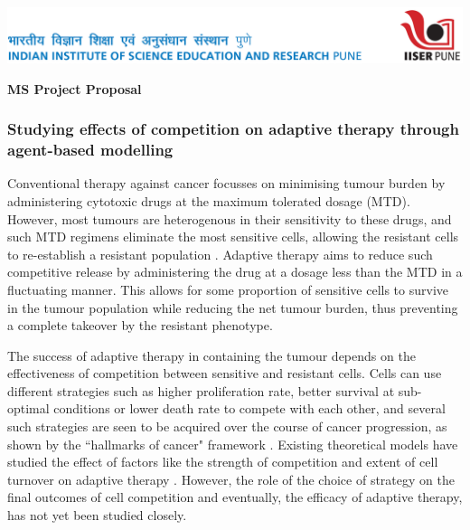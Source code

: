 \documentclass[12pt]{article}
\newcommand\dunderline[3][-1pt]{{%
  \setbox0=\hbox{#3}
  \ooalign{\copy0\cr\rule[\dimexpr#1-#2\relax]{\wd0}{#2}}}}
\begin{document}
\vspace*{-25mm}
\hspace*{-20mm}

\includegraphics{internal-lhead.png}

\begin{center}
{\bfseries\large MS Project Proposal}
\end{center}


\subsubsection*{Studying effects of competition on adaptive therapy through agent-based modelling}

     Conventional therapy against cancer focusses on minimising tumour burden by administering cytotoxic drugs at the maximum tolerated dosage (MTD). However, most tumours are heterogenous in their sensitivity to these drugs, and such MTD regimens eliminate the most sensitive cells, allowing the resistant cells to re-establish a resistant population \cite{Gatenby}. Adaptive therapy aims to reduce such competitive release by administering the drug at a dosage less than the MTD in a fluctuating manner. This allows for some proportion of sensitive cells to survive in the tumour population while reducing the net tumour burden, thus preventing a complete takeover by the resistant phenotype.

     The success of adaptive therapy in containing the tumour depends on the effectiveness of competition between sensitive and resistant cells. Cells can use different strategies such as higher proliferation rate, better survival at sub-optimal conditions or lower death rate to compete with each other, and several such strategies are seen to be acquired over the course of cancer progression, as shown by the ``hallmarks of cancer" framework \cite{Hanahan}. Existing theoretical models have studied the effect of factors like the strength of competition and extent of cell turnover on adaptive therapy \cite{Viossat,Strobl}. However, the role of the choice of strategy on the final outcomes of cell competition and eventually, the efficacy of adaptive therapy, has not yet been studied closely.
\end{document}
